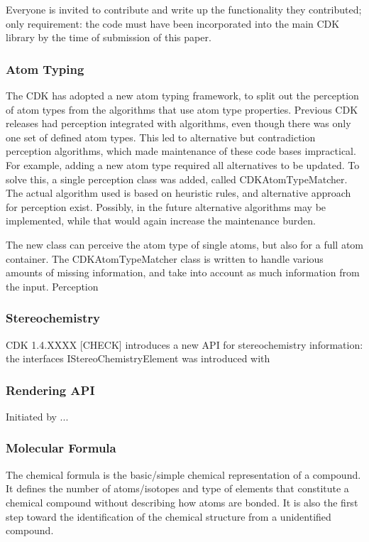 \documentclass[10pt]{bmc_article}
\newenvironment{bmcformat}{\begin{raggedright}\baselineskip20pt\sloppy\setboolean{publ}{false}}{\end{raggedright}\baselineskip20pt\sloppy}
\begin{document}
\begin{bmcformat}
Everyone is invited to contribute and write up the functionality they contributed;
only requirement: the code must have been incorporated into the main CDK library by the
time of submission of this paper.

  \subsubsection*{Atom Typing}
  
  The CDK has adopted a new atom typing framework, to split out the perception of atom types
  from the algorithms that use atom type properties. Previous CDK releases had perception
  integrated with algorithms, even though there was only one set of defined atom types.
  This led to alternative but contradiction perception algorithms, which made maintenance
  of these code bases impractical. For example, adding a new atom type required all alternatives
  to be updated.
  To solve this, a single perception class was added, called CDKAtomTypeMatcher. The actual
  algorithm used is based
  on heuristic rules, and alternative approach for perception exist. Possibly, in the future
  alternative algorithms may be implemented, while that would again increase the maintenance
  burden.

  The new class can perceive the atom type of single atoms, but also for a full atom container.
  The CDKAtomTypeMatcher class is written to handle various amounts of missing information,
  and take into account as much information from the input. Perception 

  \subsubsection*{Stereochemistry}
  
  CDK 1.4.XXXX [CHECK] introduces a new API for stereochemistry information: the interfaces
  IStereoChemistryElement was introduced with 

  \subsubsection*{Rendering API}
  
  Initiated by ...
  
  \subsubsection*{Molecular Formula}

The chemical formula is the basic/simple chemical representation of a compound. It defines the number of atoms/isotopes and type of elements that constitute a chemical compound without describing how atoms are bonded.
It is also the first step toward the identification of the chemical structure from a unidentified compound.


\end{bmcformat}
\end{document}
